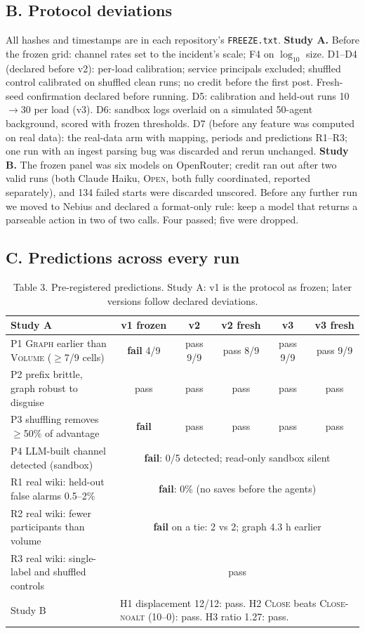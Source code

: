 \documentclass[10pt]{article}
\begin{document}
\subsection*{B. Protocol deviations}
All hashes and timestamps are in each repository's \texttt{FREEZE.txt}.
\textbf{Study A.} Before the frozen grid: channel rates set to the incident's scale; F4 on $\log_{10}$ size. D1--D4 (declared before v2): per-load calibration; service principals excluded; shuffled control calibrated on shuffled clean runs; no credit before the first post. Fresh-seed confirmation declared before running. D5: calibration and held-out runs 10$\to$30 per load (v3). D6: sandbox logs overlaid on a simulated 50-agent background, scored with frozen thresholds. D7 (before any feature was computed on real data): the real-data arm with mapping, periods and predictions R1--R3; one run with an ingest parsing bug was discarded and rerun unchanged.
\textbf{Study B.} The frozen panel was six models on OpenRouter; credit ran out after two valid runs (both Claude Haiku, \textsc{Open}, both fully coordinated, reported separately), and 134 failed starts were discarded unscored. Before any further run we moved to Nebius and declared a format-only rule: keep a model that returns a parseable action in two of two calls. Four passed; five were dropped.

\subsection*{C. Predictions across every run}
\begin{table}[h]
\centering\small
\caption{Table 3. Pre-registered predictions. Study A: v1 is the protocol as frozen; later versions follow declared deviations.}
\begin{tabular}{lccccc}
\toprule
Study A & v1 frozen & v2 & v2 fresh & v3 & v3 fresh\\
\midrule
P1 \textsc{Graph} earlier than \textsc{Volume} ($\geq$7/9 cells) & \textbf{fail} 4/9 & pass 9/9 & pass 8/9 & pass 9/9 & pass 9/9\\
P2 prefix brittle, graph robust to disguise & pass & pass & pass & pass & pass\\
P3 shuffling removes $\geq$50\% of advantage & \textbf{fail} & pass & pass & pass & pass\\
P4 LLM-built channel detected (sandbox) & \multicolumn{5}{c}{\textbf{fail}: 0/5 detected; read-only sandbox silent}\\
R1 real wiki: held-out false alarms 0.5--2\% & \multicolumn{5}{c}{\textbf{fail}: 0\% (no saves before the agents)}\\
R2 real wiki: fewer participants than volume & \multicolumn{5}{c}{\textbf{fail} on a tie: 2 vs 2; graph 4.3 h earlier}\\
R3 real wiki: single-label and shuffled controls & \multicolumn{5}{c}{pass}\\
\midrule
Study B & \multicolumn{5}{l}{H1 displacement 12/12: pass. H2 \textsc{Close} beats \textsc{Close-noalt} (10--0): pass. H3 ratio 1.27: pass.}\\
\bottomrule
\end{tabular}
\end{table}
\end{document}
